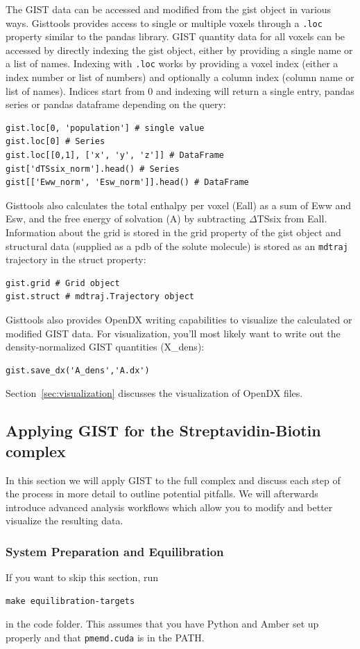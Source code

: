 \documentclass[9pt,tutorial]{livecoms}
\newcommand{\software}{\texttt}
\newcommand{\code}{\texttt}
\begin{document}
The GIST data can be accessed and modified from the gist object in various ways.
Gisttools provides access to single or multiple voxels through a \code{.loc} property similar to the pandas library. 
GIST quantity data for all voxels can be accessed by directly indexing the gist object, either by providing a single name or a list of names.
Indexing with \code{.loc} works by providing a voxel index (either a index number or list of numbers) and optionally a column index (column name or list of names). Indices start from 0 and indexing will return a single entry, pandas series or pandas dataframe depending on the query:
\begin{lstlisting}[style=python]
gist.loc[0, 'population'] # single value
gist.loc[0] # Series
gist.loc[[0,1], ['x', 'y', 'z']] # DataFrame
gist['dTSsix_norm'].head() # Series
gist[['Eww_norm', 'Esw_norm']].head() # DataFrame
\end{lstlisting}
Gisttools also calculates the total enthalpy per voxel (Eall) as a sum of Eww and Esw, and the free energy of solvation (A) by subtracting $\Delta$TSsix from Eall.\\
Information about the grid is stored in the grid property of the gist object and structural data (supplied as a pdb of the solute molecule) is stored as an \software{mdtraj} trajectory in the struct property:
\begin{lstlisting}[style=python]
gist.grid # Grid object
gist.struct # mdtraj.Trajectory object
\end{lstlisting}
Gisttools also provides OpenDX writing capabilities to visualize the calculated or modified GIST data. For visualization, you'll most likely want to write out the density-normalized GIST quantities (X\_dens):

\begin{lstlisting}[style=python]
gist.save_dx('A_dens','A.dx')
\end{lstlisting}
Section~\ref{sec:visualization} discusses the visualization of OpenDX files.

\subsection{Applying GIST for the Streptavidin-Biotin complex}
In this section we will apply GIST to the full complex and discuss each step of the process in more detail to outline potential pitfalls. We will afterwards introduce advanced analysis workflows which allow you to modify and better visualize the resulting data.
\subsubsection{System Preparation and Equilibration}
If you want to skip this section, run 
\begin{lstlisting}[style=bash]
make equilibration-targets
\end{lstlisting}
in the code folder. This assumes that you have Python and Amber set up properly and that \software{pmemd.cuda} is in the PATH.
\end{document}
